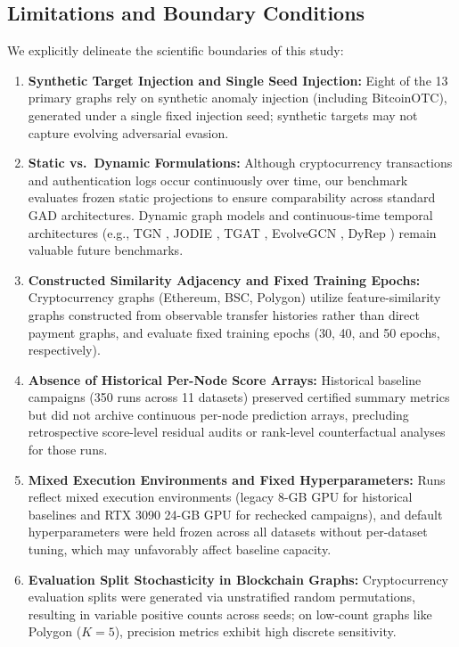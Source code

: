 \documentclass[applsci,article,submit,moreauthors,pdftex]{Definitions/mdpi}
\begin{document}
\subsection{Limitations and Boundary Conditions}
We explicitly delineate the scientific boundaries of this study:
\begin{enumerate}
    \item \textbf{Synthetic Target Injection and Single Seed Injection:} Eight of the 13 primary graphs rely on synthetic anomaly injection (including BitcoinOTC), generated under a single fixed injection seed; synthetic targets may not capture evolving adversarial evasion.
    \item \textbf{Static vs.\ Dynamic Formulations:} Although cryptocurrency transactions and authentication logs occur continuously over time, our benchmark evaluates frozen static projections to ensure comparability across standard GAD architectures. Dynamic graph models and continuous-time temporal architectures (e.g., TGN \cite{rossi2020tgn}, JODIE \cite{kumar2019jodie}, TGAT \cite{xu2020tgat}, EvolveGCN \cite{pareja2020evolvegcn}, DyRep \cite{trivedi2019dyrep}) remain valuable future benchmarks.
    \item \textbf{Constructed Similarity Adjacency and Fixed Training Epochs:} Cryptocurrency graphs (Ethereum, BSC, Polygon) utilize feature-similarity graphs constructed from observable transfer histories rather than direct payment graphs, and evaluate fixed training epochs (30, 40, and 50 epochs, respectively).
    \item \textbf{Absence of Historical Per-Node Score Arrays:} Historical baseline campaigns (350 runs across 11 datasets) preserved certified summary metrics but did not archive continuous per-node prediction arrays, precluding retrospective score-level residual audits or rank-level counterfactual analyses for those runs.
    \item \textbf{Mixed Execution Environments and Fixed Hyperparameters:} Runs reflect mixed execution environments (legacy 8-GB GPU for historical baselines and RTX 3090 24-GB GPU for rechecked campaigns), and default hyperparameters were held frozen across all datasets without per-dataset tuning, which may unfavorably affect baseline capacity.
    \item \textbf{Evaluation Split Stochasticity in Blockchain Graphs:} Cryptocurrency evaluation splits were generated via unstratified random permutations, resulting in variable positive counts across seeds; on low-count graphs like Polygon ($K=5$), precision metrics exhibit high discrete sensitivity.
\end{enumerate}
\end{document}
